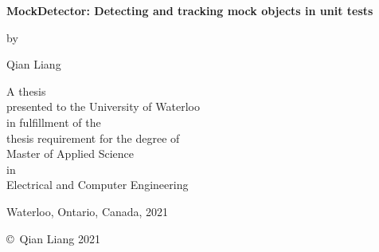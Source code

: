 \pagestyle{empty}

\begin{titlepage}
        \begin{center}
        \vspace*{1.0cm}

        \Huge
        {\bf MockDetector: Detecting and tracking mock objects in unit tests }

        \vspace*{1.0cm}

        \normalsize
        by \\

        \vspace*{1.0cm}

        \Large
        Qian Liang \\

        \vspace*{3.0cm}

        \normalsize
        A thesis \\
        presented to the University of Waterloo \\ 
        in fulfillment of the \\
        thesis requirement for the degree of \\
        Master of Applied Science \\
        in \\
        Electrical and Computer Engineering \\

        \vspace*{2.0cm}

        Waterloo, Ontario, Canada, 2021 \\

        \vspace*{1.0cm}

        \copyright\ Qian Liang 2021 \\
        \end{center}
\end{titlepage}

\pagestyle{plain}
\setcounter{page}{2}

